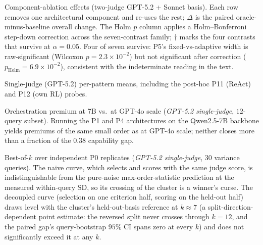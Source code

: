 \documentclass[11pt]{article}
\begin{document}
\begin{table}[H]\centering
\caption{Component-ablation effects (two-judge GPT-5.2 + Sonnet basis). Each row removes one
architectural component and re-uses the rest; $\Delta$ is the paired oracle-minus-baseline overall
change. The Holm $p$ column applies a Holm--Bonferroni step-down correction across the seven-contrast
family; $\dagger$ marks the four contrasts that survive at $\alpha{=}0.05$. Four of seven survive:
P5's fixed-vs-adaptive width is raw-significant (Wilcoxon $p{=}2.3\!\times\!10^{-2}$) but not
significant after correction ($p_{\text{Holm}}{=}6.9\!\times\!10^{-2}$), consistent with the
indeterminate reading in the text.}
\label{tab:ablations}

\end{table}

\begin{table}[H]\centering
\caption{Single-judge (GPT-5.2) per-pattern means, including the post-hoc P11 (ReAct) and P12 (own RL) probes.}
\label{tab:singlejudge}

\end{table}

\begin{table}[H]\centering
\caption{Orchestration premium at 7B vs.\ at GPT-4o scale (\emph{GPT-5.2 single-judge},
$12$-query subset). Running the P1 and P4 architectures on the Qwen2.5-7B backbone yields
premiums of the same small order as at GPT-4o scale; neither closes more than a fraction of
the $0.38$ capability gap.}
\label{tab:b2}

\end{table}

\begin{table}[H]\centering
\caption{Best-of-$k$ over independent P0 replicates (\emph{GPT-5.2 single-judge}, $30$
variance queries). The naive curve, which selects and scores with the same judge score, is
indistinguishable from the pure-noise max-order-statistic prediction at the measured
within-query SD, so its crossing of the cluster is a winner's curse. The decoupled curve
(selection on one criterion half, scoring on the held-out half) draws level with the cluster's
held-out-basis reference at $k\approx7$ (a split-direction-dependent point estimate: the
reversed split never crosses through $k{=}12$, and the paired gap's query-bootstrap
$95\%$ CI spans zero at every $k$) and does not significantly exceed it at any $k$.}
\label{tab:bestofn_decoupled}
\resizebox{\textwidth}{!}{}
\end{table}


\clearpage


\end{document}
